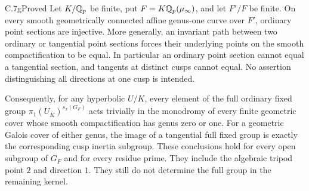 \begin{claim}{C.7g}{Proved}
Let $K/\mathbb Q_p$ be finite, put $F=K\mathbb Q_p(\mu_\infty)$, and let $F'/F$
be finite. On every smooth geometrically connected affine genus-one
curve over $F'$, ordinary point sections are injective. More generally,
an invariant path between two ordinary or tangential point sections
forces their underlying points on the smooth compactification to be
equal. In particular an ordinary point section cannot equal a
tangential section, and tangents at distinct cusps cannot equal.
No assertion distinguishing all directions at one cusp is intended.

Consequently, for any hyperbolic $U/K$, every element of the full
ordinary fixed group $\pi_1(U_{\bar K})^{s_x(G_F)}$ acts trivially
in the monodromy of every finite geometric cover whose smooth
compactification has genus zero or one. For a geometric Galois
cover of either genus, the image of a tangential full fixed group
is exactly the corresponding cusp inertia subgroup. These conclusions
hold for every open subgroup of $G_F$ and for every residue prime.
They include the algebraic tripod point $2$ and direction $1$.
They still do not determine the full group in the remaining kernel.
\end{claim}
